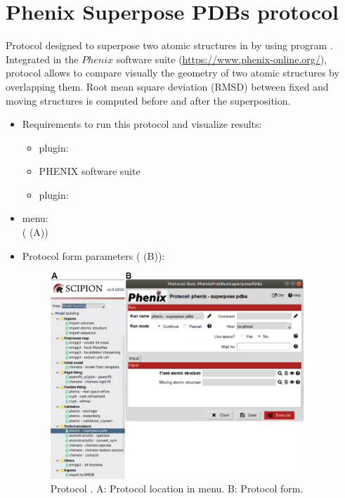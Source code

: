 \section{Phenix Superpose PDBs protocol}
\label{app:superposePdbsProtocol}%
Protocol designed to superpose two atomic structures in \scipion by using  program \citep{zwartUrl}. Integrated in the $Phenix$ software suite (\url{https://www.phenix-online.org/}), \phenix protocol  allows to compare visually the geometry of two atomic structures by overlapping them. Root mean square deviation (RMSD) between fixed and moving structures is computed before and after the superposition. 

\begin{itemize}
 \item Requirements to run this protocol and visualize results:
    \begin{itemize}
        \item \scipion plugin: 
        \item PHENIX software suite 
        \item \scipion plugin: 
    \end{itemize}
 \item \scipion menu:\\
   ( (A))
  
 \item Protocol form parameters ( (B)):
 
 \begin{figure}[H]
     \centering 
     \captionsetup{width=.7\linewidth} 
     \includegraphics[width=0.90\textwidth]{Images_appendix/Fig153.pdf}
     \caption{Protocol . A: Protocol location in \scipion menu. B: Protocol form.}
     \label{fig:app_protocol_superpose_pdbs_1}
    \end{figure}
    

\end{itemize}
